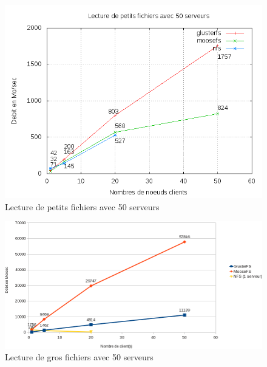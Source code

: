 \documentclass[12pt]{report}
\begin{document}
\begin{figure}[H]
\begin{center}
\includegraphics[bb=0 0 640 480,width=14cm]{images/srv50rs2.png}
\caption{Lecture de petits fichiers avec 50 serveurs}
\end{center}
\end{figure} 
		        \begin{figure}[H]
			        \begin{center}
				        \includegraphics[width=1\linewidth]{graph/calc/50RB.png}
				        \caption{Lecture de gros fichiers avec 50 serveurs}
			        \end{center}
		        \end{figure}
\end{document}
